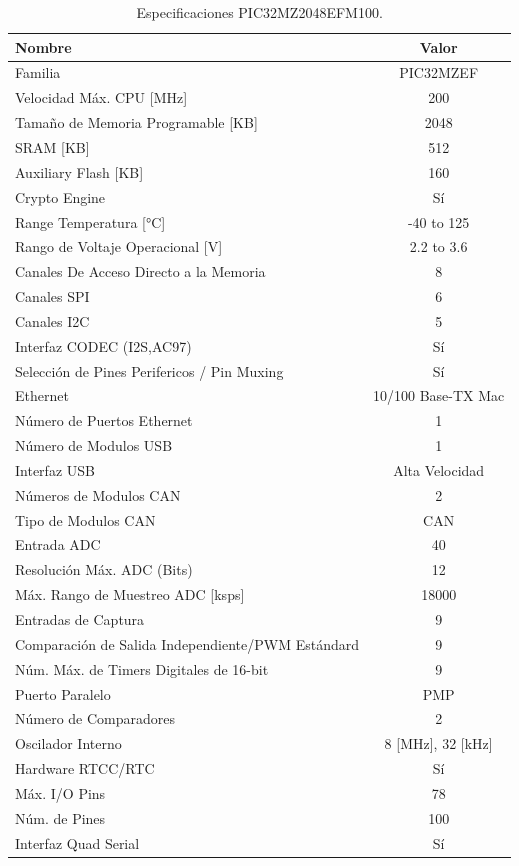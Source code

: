 \documentclass[letterpaper,12pt,oneside]{book}
\begin{document}
		\begin{table}[!ht]
				\centering
				\begin{tabular}{ l | c }
					\textbf{Nombre} & \textbf{Valor} \\
					\hline
					Familia & PIC32MZEF \\
					\hline
					Velocidad Máx. CPU [MHz] & 200 \\
					\hline
					Tamaño de Memoria Programable [KB] & 2048 \\
					\hline
					SRAM [KB] & 512\\
					\hline
					Auxiliary Flash [KB] & 160 \\
					\hline
					Crypto Engine & Sí \\
					\hline
					Range Temperatura [°C] & -40 to 125 \\
					\hline
					Rango de Voltaje Operacional [V] & 2.2 to 3.6 \\
					\hline
					Canales De Acceso Directo a la Memoria & 8 \\
					\hline
					Canales SPI & 6 \\
					\hline
					Canales I2C & 5 \\
					\hline
					Interfaz CODEC (I2S,AC97) & Sí \\
					\hline
					Selección de Pines Perifericos / Pin Muxing & Sí \\
					\hline
					Ethernet & 10/100 Base-TX Mac \\
					\hline
					Número de Puertos Ethernet  & 1 \\
					\hline
					Número de Modulos USB & 1 \\
					\hline
					Interfaz USB & Alta Velocidad \\
					\hline
					Números de Modulos CAN & 2 \\
					\hline
					Tipo de Modulos CAN & CAN \\
					\hline
					Entrada ADC & 40 \\
					\hline
					Resolución Máx. ADC (Bits) & 12 \\
					\hline
					Máx. Rango de Muestreo ADC [ksps] & 18000 \\
					\hline
					Entradas de Captura & 9 \\
					\hline
					Comparación de Salida Independiente/PWM Estándard & 9 \\
					\hline
					Núm. Máx. de Timers Digitales de 16-bit & 9 \\
					\hline
					Puerto Paralelo & PMP \\
					\hline
					Número de Comparadores & 2 \\
					\hline
					Oscilador Interno & 8 [MHz], 32 [kHz] \\
					\hline
					Hardware RTCC/RTC & Sí \\
					\hline
					Máx. I/O Pins & 78 \\
					\hline
					Núm. de Pines & 100 \\
					\hline
					Interfaz Quad Serial & Sí \\
				\end{tabular}
				\caption{Especificaciones PIC32MZ2048EFM100.}
				\label{EspPic32}
		\end{table}
\end{document}
